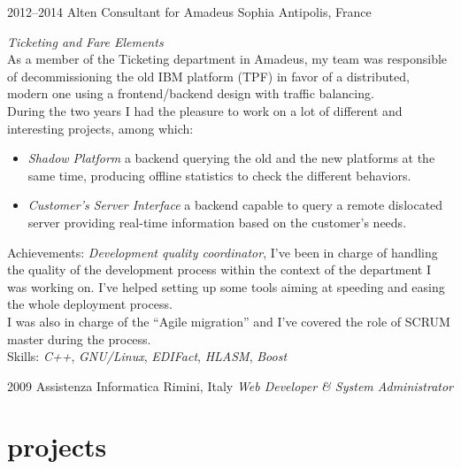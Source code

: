 \documentclass[]{friggeri-cv}
\begin{document}
\begin{entrylist}
  \entry
      {2012--2014}
      {Alten Consultant for Amadeus}
      {Sophia Antipolis, France}
      {\emph{Ticketing and Fare Elements} \\
        As a member of the Ticketing department in Amadeus, my team was
        responsible of decommissioning the old IBM platform (TPF) in favor of a
        distributed, modern one using a frontend/backend design with traffic
        balancing. \\
        During the two years I had the pleasure to work on a lot of
        different and interesting projects, among which:
        \begin{itemize}
        \item \emph{Shadow Platform} a backend querying the old and the new
          platforms at the same time, producing offline statistics to check the
          different behaviors.
        \item \emph{Customer's Server Interface} a backend capable to query a
          remote dislocated server providing real-time information based on the
          customer's needs.
        \end{itemize}
        Achievements: \emph{Development quality coordinator}, I've been in
        charge of handling the quality of the development process within the
        context of the department I was working on. I've helped setting up some
        tools aiming at speeding and easing the whole deployment process. \\
        I was also in charge of the ``Agile migration'' and I've covered the
        role of SCRUM master during the process. \\
        Skills: \emph{C++}, \emph{GNU/Linux}, \emph{EDIFact}, \emph{HLASM},
        \emph{Boost}
      }
\end{entrylist}

\begin{entrylist}
  \entry
      {2009}
      {Assistenza Informatica}
      {Rimini, Italy}
      {\emph{Web Developer \& System Administrator}}
\end{entrylist}

\section{projects}
\end{document}
